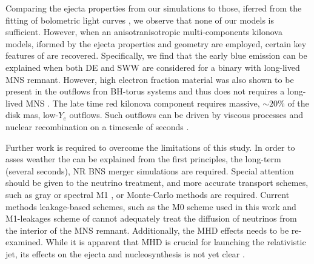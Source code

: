 Comparing the ejecta properties from our simulations to those, iferred from the 
fitting of \AT{} bolometric light curves \citep{Villar:2017wcc}, 
we observe that none of our models is sufficient. 
However, when an anisotranisotropic multi-components kilonova models, iformed by the 
ejecta properties and geometry are employed, certain key features of \AT{} are recovered.
Specifically, we find that the early blue emission can be explained 
when both \ac{DE} and \ac{SWW} are considered for a binary with long-lived \ac{MNS} remnant.
However, high electron fraction material was also shown to be present in the outflows 
fron \ac{BH}-torus systems and thus does not requires a long-lived \ac{MNS} 
\citep{Fujibayashi:2020qda}.
The late time red kilonova component requires massive, ${\sim}20\%$ of the disk mas, 
low-$Y_e$ outflows. Such outflows can be driven by viscous processes and nuclear recombination 
on a timescale of seconds \citep[\eg][]{Metzger:2008av}.

Further work is required to overcome the limitations of this study.
In order to asses weather the \AT{}  can be explained from the 
first principles, the long-term (several seconds), \ac{NR} \ac{BNS} merger simulations
are required. Special attention should be given to the neutrino treatment, and more 
accurate transport schemes, such as gray or spectral M1 \citep{Foucart:2016rxm,Roberts:2016lzn},
or Monte-Carlo methods are required. Current methods leakage-based schemes, such as 
the M0 scheme used in this work and M1-leakages scheme of \citet{Sekiguchi:2015dma,Fujibayashi:2017puw}
cannot adequately treat the diffusion of neutrinos from the interior of the \ac{MNS} remnant.
Additionally, the \ac{MHD} effects needs to be re-examined. While it is 
apparent that \ac{MHD} is crucial for launching the relativistic jet, its effects on the 
ejecta and nucleosynthesis is not yet clear \citep{Siegel:2017jug, Fernandez:2018kax}.